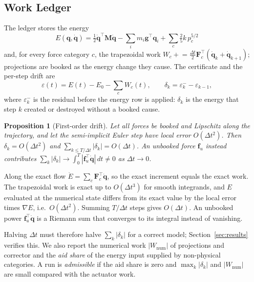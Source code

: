 \documentclass[letterpaper,10pt,conference]{IEEEtran}
\newcommand{\vect}[1]{\boldsymbol{#1}}
\newtheorem{proposition}{Proposition}
\begin{document}
\subsection{Work Ledger}
The ledger stores the energy
\begin{equation}
E(\vect q,\dot{\vect q})=\tfrac12\dot{\vect q}^\top\vect M\dot{\vect q}
-\textstyle\sum_i m_i\vect g^\top\vect q_i+\sum_{c}\tfrac25 k\,p_c^{5/2}
\end{equation}
and, for every force category $c$, the trapezoidal work
$W_c\mathrel{+}=\tfrac{\Delta t}{2}\vect F_c^\top(\dot{\vect q}_k+\dot{\vect q}_{k+1})$;
projections are booked as the energy change they cause.
The certificate and the per-step drift are
\begin{equation}
\varepsilon(t)=E(t)-E_0-\textstyle\sum_c W_c(t),\qquad
\delta_k=\varepsilon_k^{-}-\varepsilon_{k-1},
\end{equation}
where $\varepsilon_k^{-}$ is the residual before the energy row is
applied: $\delta_k$ is the energy that step $k$ created or destroyed
without a booked cause.

\begin{proposition}[First-order drift]\label{prop:drift}
Let all forces be booked and Lipschitz along the trajectory, and let the
semi-implicit Euler step have local error $O(\Delta t^2)$. Then
$\delta_k=O(\Delta t^2)$ and $\sum_{k\le T/\Delta t}|\delta_k|=O(\Delta t)$.
An unbooked force $\vect f_u$ instead contributes
$\sum_k|\delta_k|\to\int_0^T|\vect f_u^\top\dot{\vect q}|\,dt\neq0$ as
$\Delta t\to0$.
\end{proposition}
\begin{IEEEproof}
Along the exact flow $\dot E=\sum_c\vect F_c^\top\dot{\vect q}$, so the
exact increment equals the exact work. The trapezoidal work is exact up
to $O(\Delta t^3)$ for smooth integrands, and $E$ evaluated at the
numerical state differs from its exact value by the local error times
$\nabla E$, i.e.\ $O(\Delta t^2)$. Summing $T/\Delta t$ steps gives
$O(\Delta t)$. An unbooked power $\vect f_u^\top\dot{\vect q}$ is a
Riemann sum that converges to its integral instead of vanishing.
\end{IEEEproof}

\noindent Halving $\Delta t$ must therefore halve $\sum_k|\delta_k|$ for
a correct model; Section~\ref{sec:results} verifies this. We also report
the numerical work $|W_{\mathrm{num}}|$ of projections and corrector and
the \emph{aid share} of the energy input supplied by non-physical
categories. A run is \emph{admissible} if the aid share is zero and
$\max_k|\delta_k|$ and $|W_{\mathrm{num}}|$ are small compared with the
actuator work.
\end{document}
